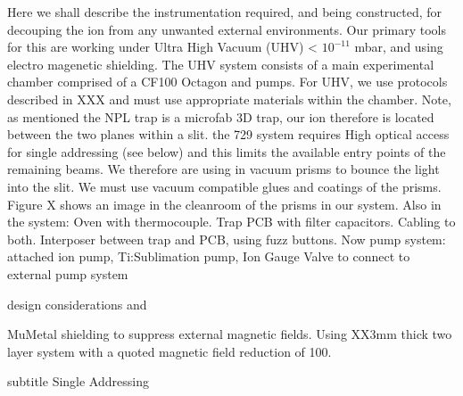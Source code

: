 \documentclass{article}
\begin{document}
Here we shall describe the instrumentation required, and being
constructed, for decouping the ion from any unwanted external
environments. Our primary tools for this are working under Ultra High
Vacuum (UHV) < $10^{-11}$ mbar, and using electro magenetic
shielding. The UHV system consists of a main experimental chamber
comprised of a CF100 Octagon and pumps. For UHV, we use protocols
described in XXX and must use appropriate materials within the
chamber. Note, as mentioned the NPL trap is a microfab 3D trap, our
ion therefore is located between the two planes within a slit. the 729
system requires High optical access for single addressing (see below)
and this limits the available entry points of the remaining beams. We
therefore are using in vacuum prisms to bounce the light into the
slit. We must use vacuum compatible glues and coatings of the
prisms. Figure X shows an image in the cleanroom of the prisms in our
system.
Also in the system:
Oven with thermocouple.
Trap PCB with filter capacitors.
Cabling to both.
Interposer between trap and PCB, using fuzz buttons.
Now pump system:
attached ion pump,
Ti:Sublimation pump,
Ion Gauge
Valve to connect to external pump system

design considerations and 

MuMetal shielding to suppress external magnetic fields. Using XX3mm
thick two layer system with a quoted magnetic field reduction of 100.


subtitle Single Addressing\\
\end{document}
